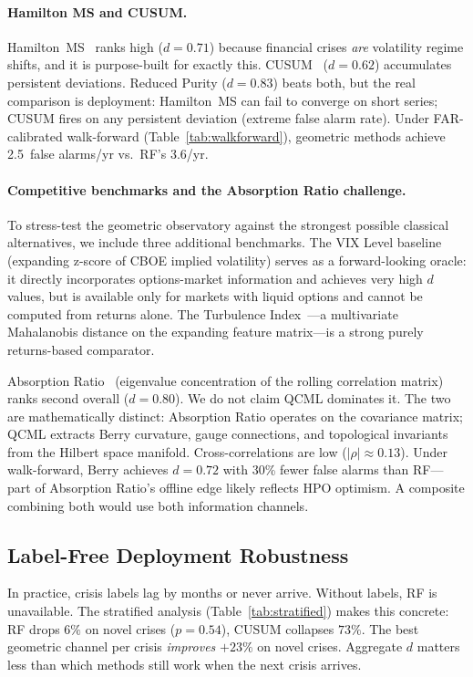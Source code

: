 \documentclass[3p]{elsarticle}
\begin{document}
\paragraph{Hamilton MS and CUSUM.}
Hamilton~MS~\cite{hamilton1989} ranks high ($d = 0.71$) because
financial crises \emph{are} volatility regime shifts, and it is
purpose-built for exactly this.  CUSUM~\cite{page1954} ($d = 0.62$)
accumulates persistent deviations.  Reduced Purity ($d = 0.83$)
beats both, but the real comparison is deployment: Hamilton~MS can
fail to converge on short series; CUSUM fires on any persistent
deviation (extreme false alarm rate).  Under FAR-calibrated
walk-forward (Table~\ref{tab:walkforward}), geometric methods achieve
2.5~false alarms/yr vs.\ RF's 3.6/yr.

\paragraph{Competitive benchmarks and the Absorption Ratio challenge.}
To stress-test the geometric observatory against the strongest possible
classical alternatives, we include three additional benchmarks.  The
VIX Level baseline (expanding z-score of CBOE implied volatility)
serves as a forward-looking oracle: it directly incorporates
options-market information and achieves very high $d$ values, but is
available only for markets with liquid options and cannot be computed
from returns alone.  The Turbulence Index~\cite{chow1999}---a
multivariate Mahalanobis distance on the expanding feature matrix---is
a strong purely returns-based comparator.

Absorption Ratio~\cite{kritzman2011} (eigenvalue concentration of the
rolling correlation matrix) ranks second overall ($d = 0.80$).  We do
not claim QCML dominates it.  The two are mathematically distinct:
Absorption Ratio operates on the covariance matrix; QCML extracts Berry
curvature, gauge connections, and topological invariants from the Hilbert
space manifold.  Cross-correlations are low ($|\rho| \approx 0.13$).
Under walk-forward, Berry achieves $d = 0.72$ with 30\% fewer false
alarms than RF---part of Absorption Ratio's offline edge likely reflects
HPO optimism.  A composite combining both would use both information
channels.

\subsection{Label-Free Deployment Robustness}

In practice, crisis labels lag by months or never arrive.  Without
labels, RF is unavailable.  The stratified analysis
(Table~\ref{tab:stratified}) makes this concrete: RF drops $6\%$ on
novel crises ($p = 0.54$), CUSUM collapses $73\%$.  The best geometric
channel per crisis \emph{improves} $+23\%$ on novel crises.  Aggregate $d$ matters less than which methods still work when the next
crisis arrives.
\end{document}
